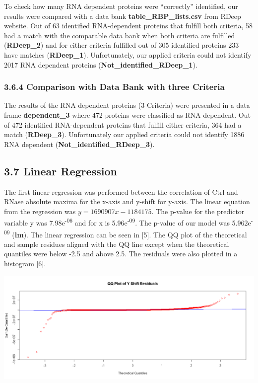 \documentclass[
]{article}
\begin{document}
To check how many RNA dependent proteins were ``correctly'' identified,
our results were compared with a data bank
\textbf{table\_RBP\_lists.csv} from RDeep website. Out of 63 identified
RNA-dependent proteins that fulfill both criteria, 58 had a match with
the comparable data bank when both criteria are fulfilled
(\textbf{RDeep\_2}) and for either criteria fulfilled out of 305
identified proteins 233 have matches (\textbf{RDeep\_1}). Unfortunately,
our applied criteria could not identify 2017 RNA dependent proteins
(\textbf{Not\_identified\_RDeep\_1}).

\hypertarget{comparison-with-data-bank-with-three-criteria}{%
\subsubsection{3.6.4 Comparison with Data Bank with three
Criteria}\label{comparison-with-data-bank-with-three-criteria}}

The results of the RNA dependent proteins (3 Criteria) were presented in
a data frame \textbf{dependent\_3} where 472 proteins were classified as
RNA-dependent. Out of 472 identified RNA-dependent proteins that fulfill
either criteria, 364 had a match (\textbf{RDeep\_3}). Unfortunately our
applied criteria could not identify 1886 RNA dependent
(\textbf{Not\_identified\_RDeep\_3}).

\hypertarget{linear-regression-1}{%
\subsection{3.7 Linear Regression}\label{linear-regression-1}}

The first linear regression was performed between the correlation of
Ctrl and RNase absolute maxima for the x-axis and y-shift for y-axis.
The linear equation from the regression was \(y = 1690907x - 1184175\).
The p-value for the predictor variable y was 7.98e\textsuperscript{-06}
and for x is 5.96e\textsuperscript{-09}. The p-value of our model was
5.962e\textsuperscript{-09} (\textbf{lm}). The linear regression can be
seen in {[}5{]}. The QQ plot of the theoretical and sample residues
aligned with the QQ line except when the theoretical quantiles were
below -2.5 and above 2.5. The residuals were also plotted in a histogram
{[}6{]}.

\includegraphics{../results/png/QQ_Y.png}
\end{document}
